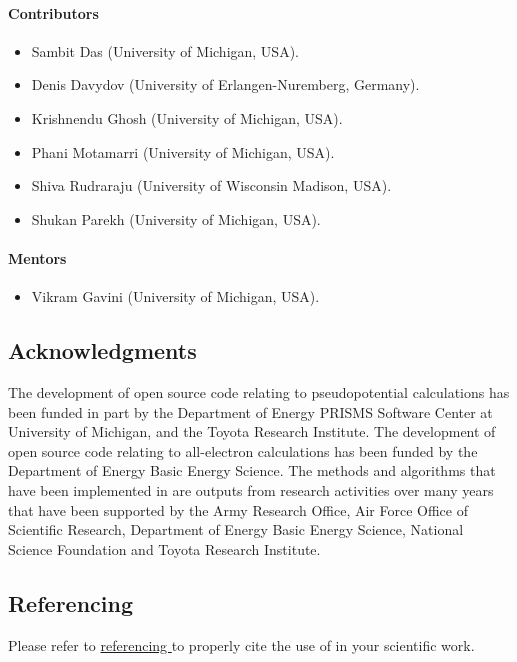 \paragraph{Contributors}
\begin{itemize}
	\item Sambit Das (University of Michigan, USA).
	\item Denis Davydov (University of Erlangen-Nuremberg, Germany).
	\item Krishnendu Ghosh (University of Michigan, USA).
	\item Phani Motamarri (University of Michigan, USA).
	\item Shiva Rudraraju (University of Wisconsin Madison, USA).
	\item Shukan Parekh (University of Michigan, USA). 	
\end{itemize}

\paragraph{Mentors}
\begin{itemize}
	\item Vikram Gavini (University of Michigan, USA).
\end{itemize}

\subsection{Acknowledgments}
The development of \dftfe{} open source code relating to pseudopotential calculations has been funded in part by the Department of Energy PRISMS Software Center at University of Michigan, and the Toyota Research Institute. The development of \dftfe{} open source code relating to all-electron calculations has been funded by the Department of Energy Basic Energy Science. The methods and algorithms that have been implemented in \dftfe{} are outputs from research activities over many years that have been supported by the Army Research Office, Air Force Office of Scientific Research, Department of Energy Basic Energy Science, National Science Foundation and Toyota Research Institute. 

\subsection{Referencing \dftfe{}}
Please refer to \href{https://sites.google.com/umich.edu/dftfe/referencing}{referencing  \dftfe{}} to properly cite the use of \dftfe{} in your scientific work. 
